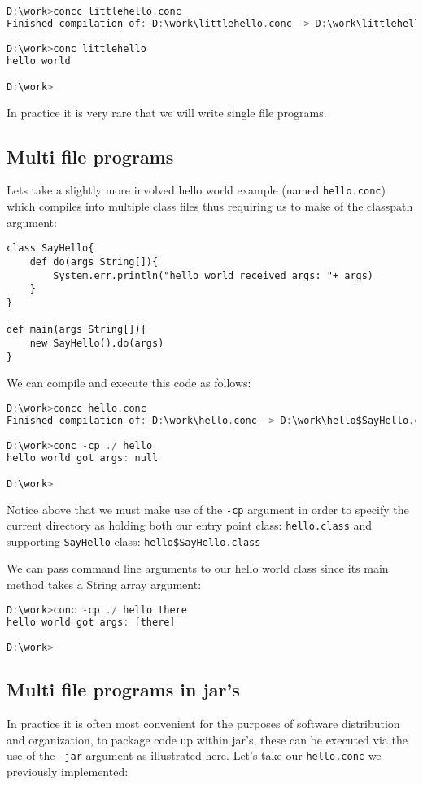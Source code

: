 \documentclass[conc-doc]{subfiles}
\begin{document}
\begin{lstlisting}[language=C]
D:\work>concc littlehello.conc
Finished compilation of: D:\work\littlehello.conc -> D:\work\littlehello.class [littlehello]

D:\work>conc littlehello
hello world

D:\work>
\end{lstlisting}

In practice it is very rare that we will write single file programs.

\subsection{Multi file programs}
Lets take a slightly more involved hello world example (named \lstinline{hello.conc}) which compiles into multiple class files thus requiring us to make of the classpath argument:

\begin{lstlisting}
class SayHello{
	def do(args String[]){
		System.err.println("hello world received args: "+ args)
	}
}

def main(args String[]){
	new SayHello().do(args)
}
\end{lstlisting}

We can compile and execute this code as follows:

\begin{lstlisting}[language=C]
D:\work>concc hello.conc
Finished compilation of: D:\work\hello.conc -> D:\work\hello$SayHello.class [hello$SayHello], D:\work\hello.class [hello]

D:\work>conc -cp ./ hello
hello world got args: null

D:\work>
\end{lstlisting}

Notice above that we must make use of the \lstinline{-cp} argument in order to specify the current directory as holding both our entry point class: \lstinline{hello.class} and supporting \lstinline{SayHello} class: \lstinline{hello$SayHello.class}

We can pass command line arguments to our hello world class since its main method takes a String array argument:
\begin{lstlisting}[language=C]
D:\work>conc -cp ./ hello there
hello world got args: [there]

D:\work>
\end{lstlisting}


\subsection{Multi file programs in jar's}
In practice it is often most convenient for the purposes of software distribution and organization, to package code up within jar's, these can be executed via the use of the \lstinline{-jar} argument as illustrated here. Let's take our \lstinline{hello.conc} we previously implemented:
\end{document}
